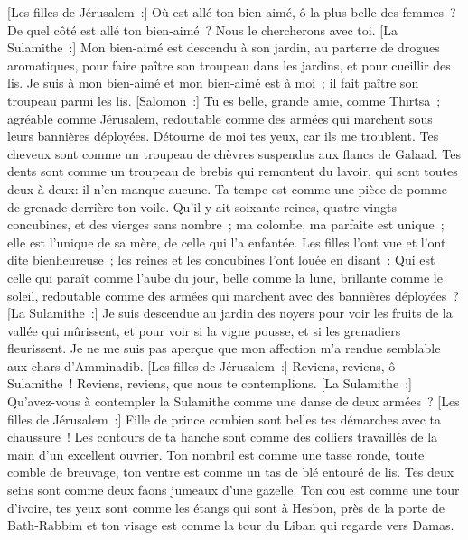\begin{multicols}{2}
\VerseOne{}[Les filles de Jérusalem~:] Où est allé ton bien-aimé, ô la plus belle des femmes~? De quel côté est allé ton bien-aimé~? Nous le chercherons avec toi.
[La Sulamithe~:] Mon bien-aimé est descendu à son jardin, au parterre de drogues aromatiques, pour faire paître son troupeau dans les jardins, et pour cueillir des lis.
Je suis à mon bien-aimé et mon bien-aimé est à moi~; il fait paître son troupeau parmi les lis.
[Salomon~:] Tu es belle, grande amie, comme Thirtsa~; agréable comme Jérusalem, redoutable comme des armées qui marchent sous leurs bannières déployées. 
Détourne de moi tes yeux, car ils me troublent. Tes cheveux sont comme un troupeau de chèvres suspendus aux flancs de Galaad.
Tes dents sont comme un troupeau de brebis qui remontent du lavoir, qui sont toutes deux à deux: il n'en manque aucune.
Ta tempe est comme une pièce de pomme de grenade derrière ton voile.
Qu'il y ait soixante reines, quatre-vingts concubines, et des vierges sans nombre~;
ma colombe, ma parfaite est unique~; elle est l'unique de sa mère, de celle qui l'a enfantée. Les filles l'ont vue et l'ont dite bienheureuse~; les reines et les concubines l'ont louée en disant~:
Qui est celle qui paraît comme l'aube du jour, belle comme la lune, brillante comme le soleil, redoutable comme des armées qui marchent avec des bannières déployées~?
[La Sulamithe~:] Je suis descendue au jardin des noyers pour voir les fruits de la vallée qui mûrissent, et pour voir si la vigne pousse, et si les grenadiers fleurissent.
Je ne me suis pas aperçue que mon affection m'a rendue semblable aux chars d'Amminadib.
\VerseOne{}[Les filles de Jérusalem~:] Reviens, reviens, ô Sulamithe~! Reviens, reviens, que nous te contemplions. [La Sulamithe~:] Qu'avez-vous à contempler la Sulamithe comme une danse de deux armées~?
[Les filles de Jérusalem~:] Fille de prince combien sont belles tes démarches avec ta chaussure~! Les contours de ta hanche sont comme des colliers travaillés de la main d'un excellent ouvrier.
Ton nombril est comme une tasse ronde, toute comble de breuvage, ton ventre est comme un tas de blé entouré de lis.
Tes deux seins sont comme deux faons jumeaux d'une gazelle.
Ton cou est comme une tour d'ivoire, tes yeux sont comme les étangs qui sont à Hesbon, près de la porte de Bath-Rabbim et ton visage est comme la tour du Liban qui regarde vers Damas.

\end{multicols}
